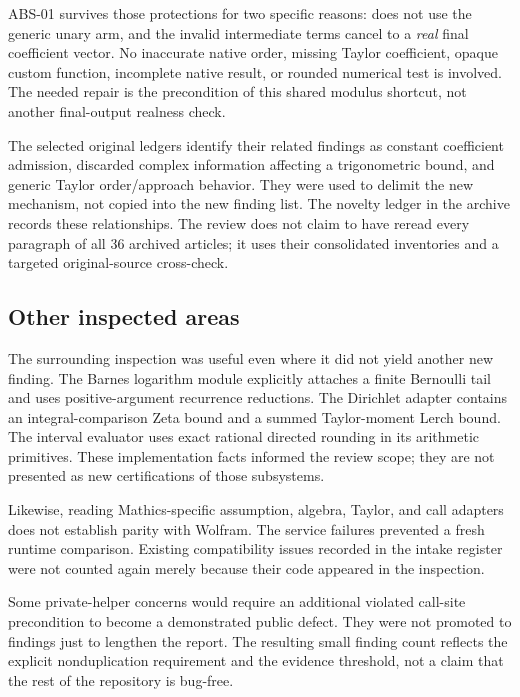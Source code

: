 \documentclass[11pt]{article}
\newcommand{\code}[1]{\texttt{\detokenize{#1}}}
\theoremstyle{remark}\newtheorem{remark}[theorem]{Remark}
\begin{document}
ABS-01 survives those protections for two specific reasons: \code{Abs} does not
use the generic unary arm, and the invalid intermediate terms cancel to a
\emph{real} final coefficient vector. No inaccurate native order, missing
Taylor coefficient, opaque custom function, incomplete native result, or
rounded numerical test is involved. The needed repair is the precondition of
this shared modulus shortcut, not another final-output realness check.

The selected original ledgers identify their related findings as constant
coefficient admission, discarded complex information affecting a trigonometric
bound, and generic Taylor order/approach behavior. They were used to delimit the
new mechanism, not copied into the new finding list.\cite{review7,review12,review22,review25}
The novelty ledger in the archive records these relationships. The review does
not claim to have reread every paragraph of all 36 archived articles; it uses
their consolidated inventories and a targeted original-source cross-check.

\subsection{Other inspected areas}
The surrounding inspection was useful even where it did not yield another new
finding. The Barnes logarithm module explicitly attaches a finite Bernoulli
tail and uses positive-argument recurrence reductions. The Dirichlet adapter
contains an integral-comparison Zeta bound and a summed Taylor-moment Lerch
bound. The interval evaluator uses exact rational directed rounding in its
arithmetic primitives. These implementation facts informed the review scope;
they are not presented as new certifications of those subsystems.\cite{barnes,dirichlet,certificates}

Likewise, reading Mathics-specific assumption, algebra, Taylor, and call adapters
does not establish parity with Wolfram. The service failures prevented a fresh
runtime comparison. Existing compatibility issues recorded in the intake
register were not counted again merely because their code appeared in the
inspection.\cite{wave4,sourcemap}

Some private-helper concerns would require an additional violated call-site
precondition to become a demonstrated public defect. They were not promoted
to findings just to lengthen the report. The resulting small finding count
reflects the explicit nonduplication requirement and the evidence threshold,
not a claim that the rest of the repository is bug-free.
\end{document}
